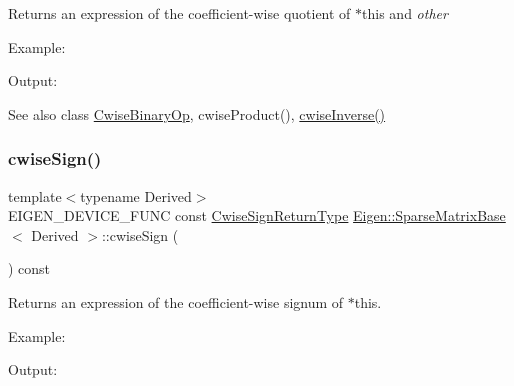 \begin{DoxyReturn}{Returns}
an expression of the coefficient-\/wise quotient of $\ast$this and {\itshape other} 
\end{DoxyReturn}
Example\+: 
\begin{DoxyCodeInclude}{0}
\end{DoxyCodeInclude}
 Output\+: 
\begin{DoxyVerbInclude}
\end{DoxyVerbInclude}


\begin{DoxySeeAlso}{See also}
class \mbox{\hyperlink{class_eigen_1_1_cwise_binary_op}{Cwise\+Binary\+Op}}, cwise\+Product(), \mbox{\hyperlink{class_eigen_1_1_sparse_matrix_base_a95fe63ce71f4dac974b9f36fd2e6e8fd}{cwise\+Inverse()}} 
\end{DoxySeeAlso}
\mbox{\label{class_eigen_1_1_sparse_matrix_base_a8498baacdc71d7f8b0df4ba0077a6487}} 
\subsubsection{\texorpdfstring{cwiseSign()}{cwiseSign()}}
{\footnotesize\ttfamily template$<$typename Derived$>$ \\
E\+I\+G\+E\+N\+\_\+\+D\+E\+V\+I\+C\+E\+\_\+\+F\+U\+NC const \mbox{\hyperlink{class_eigen_1_1_cwise_unary_op}{Cwise\+Sign\+Return\+Type}} \mbox{\hyperlink{class_eigen_1_1_sparse_matrix_base}{Eigen\+::\+Sparse\+Matrix\+Base}}$<$ Derived $>$\+::cwise\+Sign (\begin{DoxyParamCaption}{ }\end{DoxyParamCaption}) const\hspace{0.3cm}{\ttfamily [inline]}}

\begin{DoxyReturn}{Returns}
an expression of the coefficient-\/wise signum of $\ast$this.
\end{DoxyReturn}
Example\+: 
\begin{DoxyCodeInclude}{0}
\end{DoxyCodeInclude}
 Output\+: 
\begin{DoxyVerbInclude}
\end{DoxyVerbInclude}
 \mbox{\label{class_eigen_1_1_sparse_matrix_base_aeb61b3c78244395783b29d73cbf5e61d}} 
